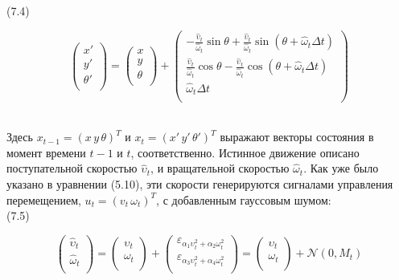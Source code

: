 \documentclass[10pt,a4paper]{article}
\begin{document}
(7.4) 
\begin{minipage}{0.2\textwidth}
	\begin{equation*}
	\left(\begin{array}{c}
	x'\\
	y'\\
	\theta'\\
	\end{array}\right)
	=
	\left(\begin{array}{c}
	x\\
	y\\
	\theta\\
	\end{array}\right)
	+
	\left(\begin{array}{c}
    -\frac{\hat{\upsilon}_t}{\hat{\omega}_t}\sin\theta+\frac{\hat{\upsilon}_t}{\hat{\omega}_t}\sin(\theta+\hat{\omega}_t\varDelta t)\\
	\frac{\hat{\upsilon}_t}{\hat{\omega}_t}\cos\theta-\frac{\hat{\upsilon}_t}{\hat{\omega}_t}\cos(\theta+\hat{\omega}_t\varDelta t)\\
    \hat{\omega}_t\varDelta t\\
	\end{array}\right)
	\end{equation*}
\end{minipage}\\ 

Здесь $x_{t-1} = (x\,y\,\theta)^T$ и $x_t = (x'\,y'\,\theta')^T$ выражают векторы состояния в момент времени $t - 1$ и $t$, соответственно. Истинное движение описано поступательной скоростью
$\hat{\upsilon}_t$, и вращательной скоростью $\hat{\omega}_t$. Как уже было указано в уравнении (5.10), эти скорости генерируются сигналами управления перемещением, $u_t = (v_t\, \omega_t)^T$, с добавленным гауссовым шумом:\\

(7.5)
\begin{minipage}{0.2\textwidth}
	\begin{equation*}
	\left(\begin{array}{c}
	\hat{\upsilon}_t\\
	\hat{\omega}_t\\
	\end{array}\right)
	=
	\left(\begin{array}{c}
	\upsilon_t\\
	\omega_t\\
	\end{array}\right)
	+
	\left(\begin{array}{c}
	\varepsilon_{\alpha_1\upsilon_t^2+\alpha_2\omega_t^2}\\
	\varepsilon_{\alpha_3\upsilon_t^2+\alpha_4\omega_t^2}\\
	\end{array}\right)
	=
	\left(\begin{array}{c}
	\upsilon_t\\
	\omega_t\\
	\end{array}\right)
	+\mathcal{N}(0,M_t)
	\end{equation*}
\end{minipage}\\
\end{document}
